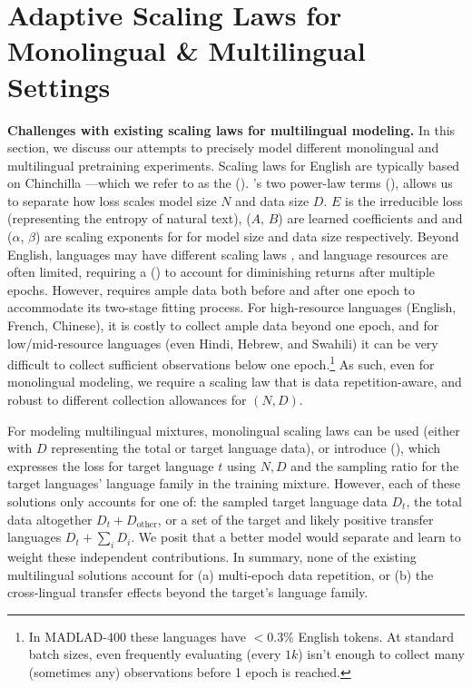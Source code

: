 

\section{Adaptive Scaling Laws for Monolingual \& Multilingual Settings}
\label{sec:multilingual-scaling}




\noindent\textbf{Challenges with existing scaling laws for multilingual modeling.} In this section, we discuss our attempts to precisely model different monolingual and multilingual pretraining experiments.
Scaling laws for English are typically based on Chinchilla \citep{hoffmann2022training}---which we refer to as the \basicscl{} (\basicsclabb).
\citet{hoffmann2022training}'s two power-law terms (), allows us to separate how loss scales model size $N$ and data size $D$.
$E$ is the irreducible loss (representing the entropy of natural text), ($A$, $B$) are learned coefficients and and ($\alpha$, $\beta$) are scaling exponents for for model size and data size respectively.
Beyond English, languages may have different scaling laws \citep{arnett2025language}, and language resources are often limited, requiring a \dcsl{} (\dcslabb) \citep{muennighoff2024scaling} to account for diminishing returns after multiple epochs.
However, \dcslabb{} requires ample data both before and after one epoch to accommodate its two-stage fitting process.
For high-resource languages (English, French, Chinese), it is costly to collect ample data beyond one epoch, and for low/mid-resource languages (even Hindi, Hebrew, and Swahili) it can be very difficult to collect sufficient observations below one epoch.\footnote{In MADLAD-400 these languages have $<0.3\%$ English tokens. At standard batch sizes, even frequently evaluating (every $1k$) isn't enough to collect many (sometimes any) observations before 1 epoch is reached.}
As such, even for monolingual modeling, we require a scaling law that is data repetition-aware, and robust to different collection allowances for $(N,D)$.

For modeling multilingual mixtures, monolingual scaling laws can be used (either with $D$ representing the total or target language data), or \citet{he2024scaling} introduce \mscl{} (\msclabb), which expresses the loss for target language $t$ using $N,D$ and the sampling ratio for the target languages' language family in the training mixture.
However, each of these solutions only accounts for one of: the sampled target language data $D_{t}$, the total data altogether $D_{t} + D_{\mathrm{other}}$, or a set of the target and likely positive transfer languages $D_t+\sum_{i} D_i$.
We posit that a better model would separate and learn to weight these independent contributions.
In summary, none of the existing multilingual solutions account for (a) multi-epoch data repetition, or (b) the cross-lingual transfer effects beyond the target's language family.

